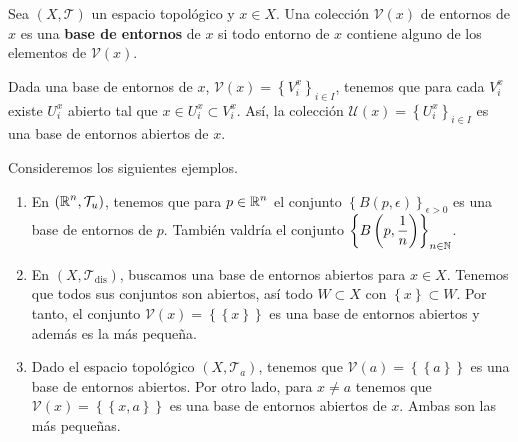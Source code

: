 \begin{definition}
Sea $\displaystyle \left(X, \mathcal{T}\right) $ un espacio topológico y $\displaystyle x \in X $. Una colección $\displaystyle \mathcal{V}\left(x\right) $ de entornos de $\displaystyle x $ es una \textbf{base de entornos} de $\displaystyle x $ si todo entorno de $\displaystyle x $ contiene alguno de los elementos de $\displaystyle \mathcal{V}\left(x\right) $.
\end{definition}
\begin{observation}
	Dada una base de entornos de $\displaystyle x $, $\displaystyle \mathcal{V}\left(x\right)= \left\{ V^{x}_{i}\right\} _{i \in I} $, tenemos que para cada $\displaystyle V^{x}_{i} $ existe $\displaystyle U^{x}_{i} $ abierto tal que $\displaystyle x \in U^{x}_{i}\subset V^{x}_{i} $. Así, la colección $\displaystyle \mathcal{U}\left(x\right)= \left\{ U^{x}_{i}\right\} _{i \in I} $ es una base de entornos abiertos de $\displaystyle x $. 
\end{observation}
\begin{eg}
Consideremos los siguientes ejemplos. 
\begin{enumerate}
\item En $\displaystyle \left(\mathbb{R}^{n}, \mathcal{T}_{u}\right) $, tenemos que para $\displaystyle p \in \mathbb{R}^{n} $ el conjunto $\displaystyle \left\{ B\left(p, \epsilon \right)\right\} _{\epsilon > 0} $ es una base de entornos de $\displaystyle p $. También valdría el conjunto $\displaystyle \left\{ B\left(p, \frac{1}{n}\right)\right\} _{n\in\mathbb{N}} $.
\item En $\displaystyle \left(X, \mathcal{T}_{\text{dis}}\right) $, buscamos una base de entornos abiertos para $\displaystyle x \in X $. Tenemos que todos sus conjuntos son abiertos, así todo $\displaystyle W \subset X $ con $\displaystyle \left\{ x\right\} \subset W $. Por tanto, el conjunto $\displaystyle \mathcal{V}\left(x\right)=\left\{ \left\{ x\right\} \right\}  $ es una base de entornos abiertos y además es la más pequeña.
\item Dado el espacio topológico $\displaystyle \left(X, \mathcal{T}_{a}\right) $, tenemos que $\displaystyle \mathcal{V}\left(a\right)= \left\{ \left\{ a\right\} \right\}  $ es una base de entornos abiertos. Por otro lado, para $\displaystyle x \neq a $ tenemos que $\displaystyle \mathcal{V}\left(x\right)= \left\{ \left\{ x, a\right\} \right\}  $ es una base de entornos abiertos de $\displaystyle x $. Ambas son las más pequeñas.
\end{enumerate}
\end{eg}

